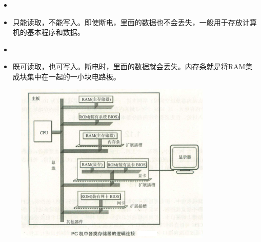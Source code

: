  \begin{frame}
 

\begin{itemize}
\item {} 
\item[] 只能读取，不能写入。即使断电，里面的数据也不会丢失，一般用于存放计算机的基本程序和数据。\\[0.1in] 
\item {}
\item[] 既可读取，也可写入。断电时，里面的数据就会丢失。{内存条就是将RAM集成块集中在一起的一小块电路板。}\\[0.2in]

\end{itemize}
 \end{frame}
 
\begin{frame}[fragile]
\begin{figure}[h] 
\centering
\includegraphics[width=3.7in]{ch01/fig/PCLink}
\end{figure}
\end{frame}
